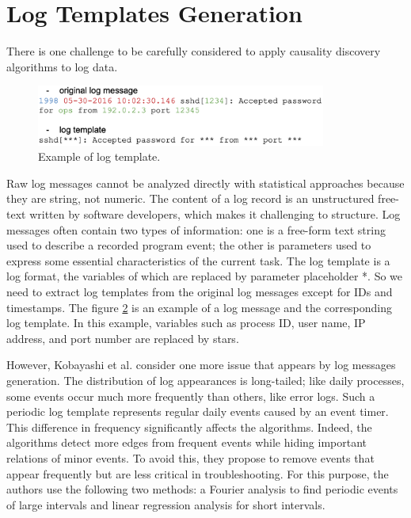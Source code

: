 \section{Log Templates Generation}
\label{sec:3}
There is one challenge to be carefully considered to apply causality discovery algorithms to log data.
\begin{figure}[h]
\centering
    \label{fig:log-template}
    \includegraphics[width=0.85\textwidth]{figures/log_template.png}
    \caption{Example of log template.}
\end{figure}
Raw log messages cannot be analyzed directly with statistical approaches because they are string, not numeric. The content of a log record is an unstructured free-text written by software developers, which makes it challenging to structure. Log messages often contain two types of information: one is a free-form text string used to describe a recorded program event; the other is parameters used to express some essential characteristics of the current task. The log template is a log format, the variables of which are replaced by parameter placeholder *. So we need to extract log templates from the original log messages except for IDs and timestamps. The figure \hyperref[fig:log-template]{2} is an example of a log message and the corresponding log template. In this example, variables such as process ID, user name, IP address, and port number are replaced by stars.\newline

However, Kobayashi et al. \cite{jarry2021quantitative,kobayashi2017mining} consider one more issue that appears by log messages generation. The distribution of log appearances is long-tailed; like daily processes, some events occur much more frequently than others, like error logs. Such a periodic log template represents regular daily events caused by an event timer. This difference in frequency significantly affects the algorithms. Indeed, the algorithms detect more edges from frequent events while hiding important relations of minor events. To avoid this, they propose to remove events that appear frequently but are less critical in troubleshooting. For this purpose, the authors use the following two methods: a Fourier analysis to find periodic events of large intervals and linear regression analysis for short intervals.\newline

